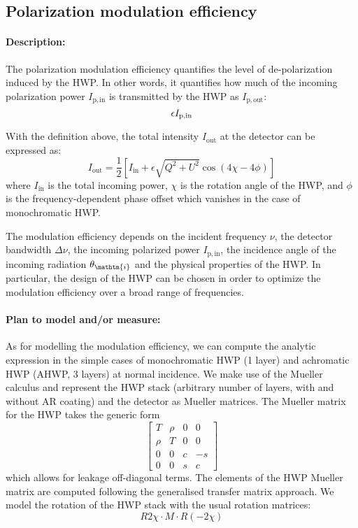 
\subsection{Polarization modulation efficiency}\label{subsec:modeff}

\paragraph{Description:}
The polarization modulation efficiency quantifies the level of de-polarization induced by the HWP. In other words, it quantifies how much of the incoming polarization power $I_\mathrm{p,in}$ is transmitted by the HWP as $I_\mathrm{p,out}$:
\begin{equation}
\epsilon\def \frac{I_\mathrm{p,out}}{I_\mathrm{p,in}}
\end{equation}

With the definition above, the total intensity $I_\mathrm{out}$ at the detector can be expressed as:
\begin{equation}
I_\mathrm{out}=\frac{1}{2}\left[I_\mathrm{in}+\epsilon\sqrt{Q^2+U^2} \cos(4\chi-4\phi)\right]
\end{equation}
where $I_\mathrm{in}$ is the total incoming power, $\chi$ is the rotation angle of the HWP, and $\phi$ is the frequency-dependent phase offset which vanishes in the case of monochromatic HWP.

The modulation efficiency depends on the incident frequency $\nu$, the detector bandwidth $\Delta \nu$, the incoming polarized power $I_\mathrm{p,in}$, the incidence angle of the incoming radiation $\theta_\mathtm{i}$ and the physical properties of the HWP. In particular, the design of the HWP can be chosen in order to optimize the modulation efficiency over a broad range of frequencies. 

\paragraph{Plan to model and/or measure:}
As for modelling the modulation efficiency, we can compute the analytic expression in the simple cases of monochromatic HWP (1 layer) and achromatic HWP (AHWP, 3 layers) at normal incidence. We make use of the Mueller calculus and represent the HWP stack (arbitrary number of layers, with and without AR coating) and the detector as Mueller matrices. The Mueller matrix for the HWP takes the generic form 
\begin{equation}
\begin{bmatrix}
   T  &\rho  &0  &0\\
   \rho  &T  &0  &0\\
   0  &0  &c  &-s\\
   0  &0  &s  &c
\end{bmatrix}
\end{equation}
which allows for leakage off-diagonal terms. The elements of the HWP Mueller matrix are computed following the generalised transfer matrix approach. We model the rotation of the HWP stack with the usual rotation matrices:
\begin{equation}
R{2\chi}\cdot M \cdot R(-2\chi)
\end{equation}

